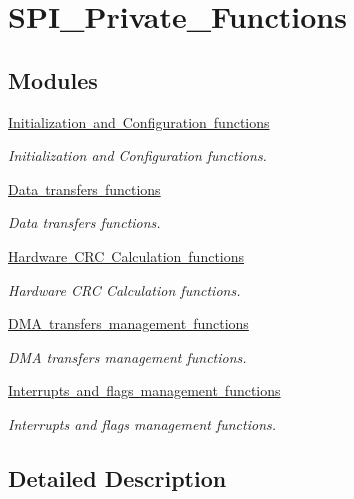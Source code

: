 \hypertarget{group___s_p_i___private___functions}{}\section{S\+P\+I\+\_\+\+Private\+\_\+\+Functions}
\label{group___s_p_i___private___functions}
\subsection*{Modules}
\begin{DoxyCompactItemize}
\item 
\mbox{\hyperlink{group___s_p_i___group1}{Initialization and Configuration functions}}
\begin{DoxyCompactList}\small\item\em Initialization and Configuration functions. \end{DoxyCompactList}\item 
\mbox{\hyperlink{group___s_p_i___group2}{Data transfers functions}}
\begin{DoxyCompactList}\small\item\em Data transfers functions. \end{DoxyCompactList}\item 
\mbox{\hyperlink{group___s_p_i___group3}{Hardware C\+R\+C Calculation functions}}
\begin{DoxyCompactList}\small\item\em Hardware C\+RC Calculation functions. \end{DoxyCompactList}\item 
\mbox{\hyperlink{group___s_p_i___group4}{D\+M\+A transfers management functions}}
\begin{DoxyCompactList}\small\item\em D\+MA transfers management functions. \end{DoxyCompactList}\item 
\mbox{\hyperlink{group___s_p_i___group5}{Interrupts and flags management functions}}
\begin{DoxyCompactList}\small\item\em Interrupts and flags management functions. \end{DoxyCompactList}\end{DoxyCompactItemize}


\subsection{Detailed Description}
